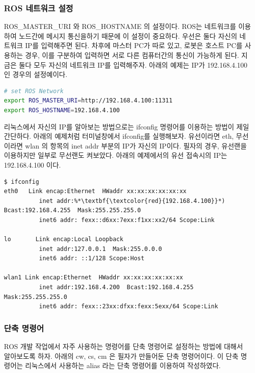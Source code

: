 \subsubsection{ROS 네트워크 설정}
ROS\_MASTER\_URI 와 ROS\_HOSTNAME 의 설정이다. ROS는 네트워크를 이용하여 노드간에 메시지 통신을하기 때문에 이 설정이 중요하다. 우선은 둘다 자신의 네트워크 IP를 입력해주면 된다. 차후에 마스터 PC가 따로 있고, 로봇은 호스트 PC를 사용하는 경우, 이를 구분하여 입력하면 서로 다른 컴퓨터간의 통신이 가능하게 된다. 지금은 둘다 모두 자신의 네트워크 IP를 입력해주자. 아래의 예제는 IP가 192.168.4.100 인 경우의 설정예이다. 
\\
\begin{lstlisting}[language=bash]
# set ROS Network
export ROS_MASTER_URI=http://192.168.4.100:11311
export ROS_HOSTNAME=192.168.4.100
\end{lstlisting}

\begin{exercise}[ifconfig]
리눅스에서 자신의 IP를 알아보는 방법으로는 ifconfig 명령어를 이용하는 방법이 제일 간단하다. 아래의 예제처럼 터미널창에서 ifconfig를 실행해보자. 유선이라면 eth, 무선이라면 wlan 의 항목의 inet addr 부분의 IP가 자신의 IP이다. 필자의 경우, 유선랜을 이용하지만 일부로 무선랜도 켜보았다. 아래의 예제에서의 유선 접속시의 IP는 192.168.4.100 이다.
\begin{lstlisting}[language=ROS, backgroundcolor=\color{ocre!10}, numbers=none]
$ ifconfig
eth0   Link encap:Ethernet  HWaddr xx:xx:xx:xx:xx:xx  
          inet addr:%*\textbf{\textcolor{red}{192.168.4.100}}*)  Bcast:192.168.4.255  Mask:255.255.255.0
          inet6 addr: fexx::d6xx:7exx:f1xx:xx2/64 Scope:Link

lo       Link encap:Local Loopback  
          inet addr:127.0.0.1  Mask:255.0.0.0
          inet6 addr: ::1/128 Scope:Host

wlan1 Link encap:Ethernet  HWaddr xx:xx:xx:xx:xx:xx
          inet addr:192.168.4.200  Bcast:192.168.4.255  Mask:255.255.255.0
          inet6 addr: fexx::23xx:dfxx:fexx:5exx/64 Scope:Link
\end{lstlisting}
\end{exercise}

\subsubsection{단축 명령어}
ROS 개발 작업에서 자주 사용하는 명령어를 단축 명령어로 설정하는 방법에 대해서 알아보도록 하자. 아래의 cw, cs, cm 은 필자가 만들어둔 단축 명령어이다. 이 단축 명령어는 리눅스에서 사용하는 alias 라는 단축 명령어를 이용하여 작성하였다.\\

